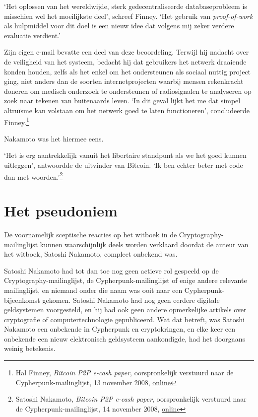 \documentclass[
  a5paper,
  smalldemyvopaper,11pt,twoside,onecolumn,openright,extrafontsizes,
hidelinks]{memoir}
\begin{document}
`Het oplossen van het wereldwijde, sterk gedecentraliseerde
databaseprobleem is misschien wel het moeilijkste deel', schreef Finney.
`Het gebruik van \emph{proof-of-work} als hulpmiddel voor dit doel is
een nieuw idee dat volgens mij zeker verdere evaluatie verdient.'

Zijn eigen e-mail bevatte een deel van deze beoordeling. Terwijl hij
nadacht over de veiligheid van het systeem, bedacht hij dat gebruikers
het netwerk draaiende konden houden, zelfs als het enkel om het
ondersteunen als sociaal nuttig project ging, niet anders dan de soorten
internetprojecten waarbij mensen rekenkracht doneren om medisch
onderzoek te ondersteunen of radiosignalen te analyseren op zoek naar
tekenen van buitenaards leven. `In dit geval lijkt het me dat simpel
altruïsme kan volstaan om het netwerk goed te laten functioneren',
concludeerde Finney.\footnote{Hal Finney, \emph{Bitcoin P2P e-cash
  paper}, oorspronkelijk verstuurd naar de Cypherpunk-mailinglijst, 13
  november 2008,
  \href{https://www.metzdowd.com/pipermail/cryptography/2008-November/014848.html}{online}}

Nakamoto was het hiermee eens.

`Het is erg aantrekkelijk vanuit het libertaire standpunt als we het
goed kunnen uitleggen', antwoordde de uitvinder van Bitcoin. `Ik ben
echter beter met code dan met woorden.'\footnote{Satoshi Nakamoto,
  \emph{Bitcoin P2P e-cash paper}, oorspronkelijk verstuurd naar de
  Cypherpunk-mailinglijst, 14 november 2008,
  \href{https://www.metzdowd.com/pipermail/cryptography/2008-November/014853.html}{online}}

\section{Het pseudoniem}\label{het-pseudoniem}

De voornamelijk sceptische reacties op het witboek in de
Cryptography-mailinglijst kunnen waarschijnlijk deels worden verklaard
doordat de auteur van het witboek, Satoshi Nakamoto, compleet onbekend
was.

Satoshi Nakamoto had tot dan toe nog geen actieve rol gespeeld op de
Cryptography-mailinglijst, de Cypherpunk-mailinglijst of enige andere
relevante mailinglijst, en niemand onder die naam was ooit naar een
Cypherpunk-bijeenkomst gekomen. Satoshi Nakamoto had nog geen eerdere
digitale geldsystemen voorgesteld, en hij had ook geen andere
opmerkelijke artikels over cryptografie of computertechnologie
gepubliceerd. Wat dat betreft, was Satoshi Nakamoto een onbekende in
Cypherpunk en cryptokringen, en elke keer een onbekende een nieuw
elektronisch geldsysteem aankondigde, had het doorgaans weinig
betekenis.
\end{document}
